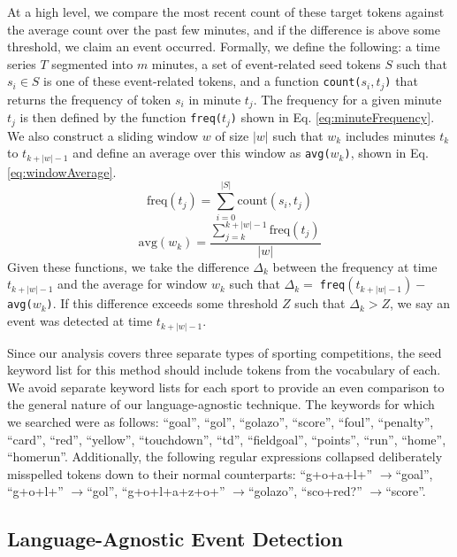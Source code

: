 \documentclass{sig-alternate}
\begin{document}
At a high level, we compare the most recent count of these target tokens against the average count over the past few minutes, and if the difference is above some threshold, we claim an event occurred.
Formally, we define the following: a time series $T$ segmented into $m$ minutes, a set of event-related seed tokens $S$ such that $s_i \in S$ is one of these event-related tokens, and a function \texttt{count($s_i, t_j$)} that returns the frequency of token $s_i$ in minute $t_j$.
The frequency for a given minute $t_j$ is then defined by the function \texttt{freq($t_j$)} shown in Eq. \ref{eq:minuteFrequency}.
We also construct a sliding window $w$ of size $|w|$ such that $w_k$ includes minutes $t_k$ to $t_{k+|w|-1}$ and define an average over this window as \texttt{avg($w_k$)}, shown in Eq. \ref{eq:windowAverage}.
%
\begin{equation}
\label{eq:minuteFrequency}
\text{freq}(t_j) = \sum_{i=0}^{|S|}\text{count}(s_i, t_j)
\end{equation}
\begin{equation}
\label{eq:windowAverage}
\text{avg}(w_k) = \frac{\sum_{j=k}^{k + |w| - 1}\text{freq}(t_j)}{|w|}
\end{equation}
%
Given these functions, we take the difference $\Delta_k$ between the frequency at time $t_{k+|w|-1}$ and the average for window $w_k$ such that $\Delta_k = \;$\texttt{freq}$(t_{k+|w|-1}) - $ \texttt{avg($w_k$)}.
If this difference exceeds some threshold $Z$ such that $\Delta_k > Z$, we say an event was detected at time $t_{k+|w|-1}$.

Since our analysis covers three separate types of sporting competitions, the seed keyword list for this method should include tokens from the vocabulary of each. 
We avoid separate keyword lists for each sport to provide an even comparison to the general nature of our language-agnostic technique.
The keywords for which we searched were as follows: ``goal'', ``gol'', ``golazo'', ``score'', ``foul'', ``penalty'', ``card'', ``red'', ``yellow'', ``touchdown'', ``td'', ``fieldgoal'', ``points'', ``run'', ``home'', ``homerun''.
Additionally, the following regular expressions collapsed deliberately misspelled tokens down to their normal counterparts: ``g+o+a+l+'' $\rightarrow$``goal'', ``g+o+l+'' $\rightarrow$``gol'', ``g+o+l+a+z+o+'' $\rightarrow$``golazo'', ``sco+red?'' $\rightarrow$``score''.

\subsection{Language-Agnostic Event Detection}
\end{document}
